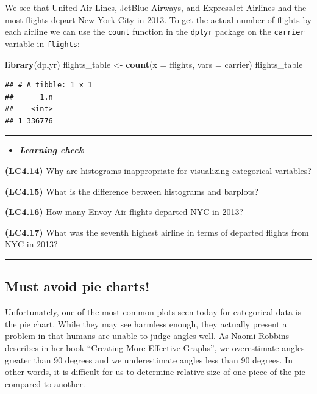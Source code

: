\documentclass[]{tufte-book}
\newenvironment{Shaded}{\begin{snugshade}}{\end{snugshade}}
\newcommand{\KeywordTok}[1]{\textcolor[rgb]{0.13,0.29,0.53}{\textbf{{#1}}}}
\newcommand{\DataTypeTok}[1]{\textcolor[rgb]{0.13,0.29,0.53}{{#1}}}
\newcommand{\StringTok}[1]{\textcolor[rgb]{0.31,0.60,0.02}{{#1}}}
\newcommand{\NormalTok}[1]{{#1}}
\newenvironment{rmdblock}[1]
  {\begin{shaded*}
  \begin{itemize}
  \renewcommand{\labelitemi}{
    \raisebox{-.7\height}[0pt][0pt]{
    }
  }
  \item
  }
  {
  \end{itemize}
  \end{shaded*}
  }
\newenvironment{learncheck}
  {\begin{rmdblock}{warning}}
  {\end{rmdblock}}
\begin{document}
We see that United Air Lines, JetBlue Airways, and ExpressJet Airlines
had the most flights depart New York City in 2013. To get the actual
number of flights by each airline we can use the \texttt{count} function
in the \texttt{dplyr} package on the \texttt{carrier} variable in
\texttt{flights}:

\begin{Shaded}
\begin{Highlighting}[]
\KeywordTok{library}\NormalTok{(dplyr)}
\NormalTok{flights_table <-}\StringTok{ }\KeywordTok{count}\NormalTok{(}\DataTypeTok{x =} \NormalTok{flights, }\DataTypeTok{vars =} \NormalTok{carrier)}
\NormalTok{flights_table}
\end{Highlighting}
\end{Shaded}

\begin{verbatim}
## # A tibble: 1 x 1
##      1.n
##    <int>
## 1 336776
\end{verbatim}

\begin{center}\rule{\linewidth}{\linethickness}\end{center}

\begin{learncheck}
\textbf{\emph{Learning check}}
\end{learncheck}

\textbf{(LC4.14)} Why are histograms inappropriate for visualizing
categorical variables?

\textbf{(LC4.15)} What is the difference between histograms and
barplots?

\textbf{(LC4.16)} How many Envoy Air flights departed NYC in 2013?

\textbf{(LC4.17)} What was the seventh highest airline in terms of
departed flights from NYC in 2013?

\begin{center}\rule{\linewidth}{\linethickness}\end{center}

\subsection{Must avoid pie charts!}\label{must-avoid-pie-charts}

Unfortunately, one of the most common plots seen today for categorical
data is the pie chart. While they may see harmless enough, they actually
present a problem in that humans are unable to judge angles well. As
Naomi Robbins describes in her book ``Creating More Effective Graphs'',
we overestimate angles greater than 90 degrees and we underestimate
angles less than 90 degrees. In other words, it is difficult for us to
determine relative size of one piece of the pie compared to another.
\end{document}
